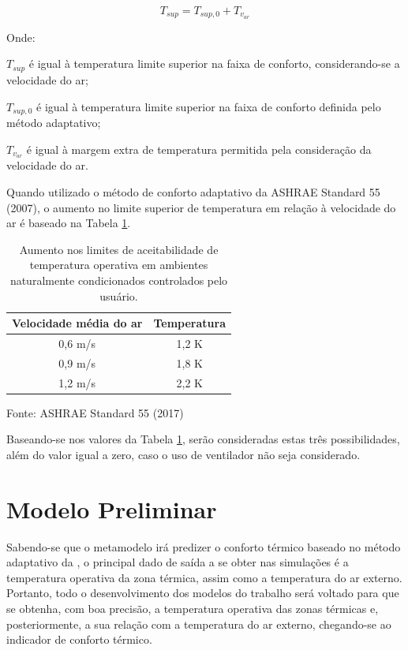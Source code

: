 \documentclass[brazil,hardcopy,openany,a5paper]{ufscthesis}
\begin{document}
		\begin{equation}
		\label{eq:Tsup}
		T_{sup} = T_{sup,0} + T_{v_{ar}}
		\end{equation}
		
		Onde:
		
		$T_{sup}$ é igual à temperatura limite superior na faixa de conforto, considerando-se a velocidade do ar;
		
		$T_{sup,0}$ é igual à temperatura limite superior na faixa de conforto definida pelo método adaptativo;
		
		$T_{v_{ar}}$ é igual à margem extra de temperatura permitida pela consideração da velocidade do ar.
		
		Quando utilizado o método de conforto adaptativo da ASHRAE Standard 55 (2007), o aumento no limite superior de temperatura em relação à velocidade do ar é baseado na Tabela \ref{table:var}.		
		
		\begin{table}[!h]
			\centering
			\caption{Aumento nos limites de aceitabilidade de temperatura operativa em ambientes naturalmente condicionados controlados pelo usuário.}
			\label{table:var}
			\begin{tabular}{|c |c |}
				\hline
				\textbf{Velocidade média do ar} & \textbf{Temperatura} \\
				\hline
				0,6 m/s & 1,2 K \\
				\hline
				0,9 m/s & 1,8 K \\
				\hline
				1,2 m/s & 2,2 K \\
				\hline 
			\end{tabular}
			\begin{flushleft}
			Fonte: ASHRAE Standard 55 (2017)
			\end{flushleft}				
		\end{table}
	
		Baseando-se nos valores da Tabela \ref{table:var}, serão consideradas estas três possibilidades, além do valor igual a zero, caso o uso de ventilador não seja considerado.
		
		\section{Modelo Preliminar}
		
		Sabendo-se que o metamodelo irá predizer o conforto térmico baseado no método adaptativo da  \cite{ASHRAEStandard552017}, o principal dado de saída a se obter nas simulações é a temperatura operativa da zona térmica, assim como a temperatura do ar externo. Portanto, todo o desenvolvimento dos modelos do trabalho será voltado para que se obtenha, com boa precisão, a temperatura operativa das zonas térmicas e, posteriormente, a sua relação com a temperatura do ar externo, chegando-se ao indicador de conforto térmico.
		
\end{document}
